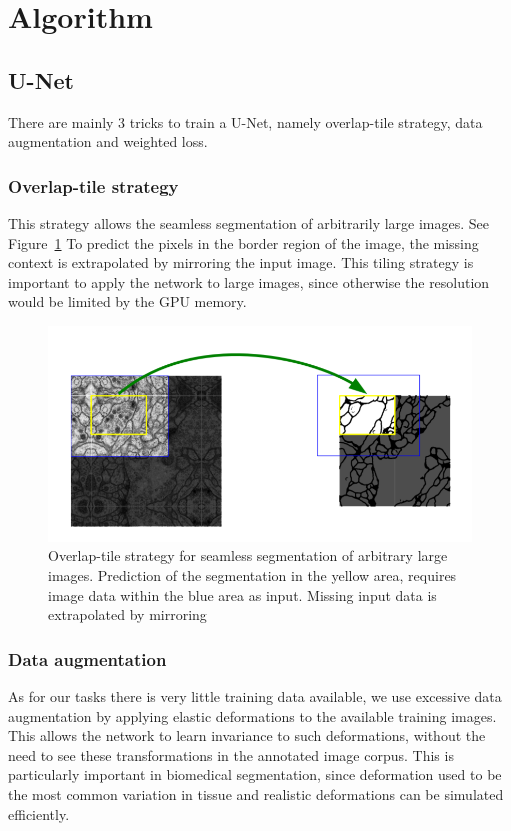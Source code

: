 \section{Algorithm}
\subsection{U-Net}
There are mainly 3 tricks to train a U-Net, namely overlap-tile strategy, data augmentation and weighted loss.
\subsubsection{Overlap-tile strategy}
This strategy allows the seamless segmentation of arbitrarily large images. See Figure~\ref{fig:overlap}
To predict the pixels in the border region
of the image, the missing context is extrapolated by mirroring the input image.
This tiling strategy is important to apply the network to large images, since
otherwise the resolution would be limited by the GPU memory.
\begin{figure}[!htpb]
    \centering
    \includegraphics[scale=0.3]{figuras/overlap-tile.PNG}
    \caption{ Overlap-tile strategy for seamless segmentation of arbitrary large images. Prediction of the segmentation in
    the yellow area, requires image data within the blue area as input. Missing input data
    is extrapolated by mirroring}
    \label{fig:overlap}
    \end{figure}
\subsubsection{Data augmentation}
As for our tasks there is very little training data available, we use excessive
data augmentation by applying elastic deformations to the available training images. This allows the network to learn invariance to such deformations, without
the need to see these transformations in the annotated image corpus. This is
particularly important in biomedical segmentation, since deformation used to
be the most common variation in tissue and realistic deformations can be simulated efficiently. 

